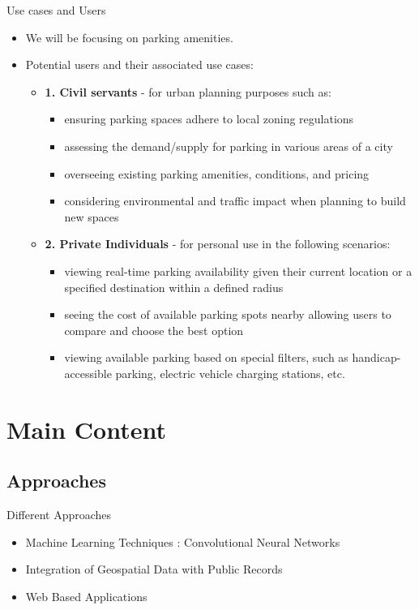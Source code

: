 \documentclass{beamer}
\begin{document}
\begin{frame}{Use cases and Users}
    \begin{itemize}
        \item We will be focusing on parking amenities.
        \item Potential users and their associated use cases:
        \begin{itemize}
            \item \textbf{1. Civil servants} - for urban planning purposes such as:
            \begin{itemize}
                \item ensuring parking spaces adhere to local zoning regulations
                \item assessing the demand/supply for parking in various areas of a city
                \item overseeing existing parking amenities, conditions, and pricing
                \item considering environmental and traffic impact when planning to build new spaces
            \end{itemize}
            \item \textbf{2. Private Individuals} - for personal use in the following scenarios:
            \begin{itemize}
                \item viewing real-time parking availability given their current location or a specified destination within a defined radius
                \item seeing the cost of available parking spots nearby allowing users to compare and choose the best option
                \item viewing available parking based on special filters, such as handicap-accessible parking, electric vehicle charging stations, etc.
            \end{itemize}
        \end{itemize}
    \end{itemize}
\end{frame}


\section{Main Content}
\subsection{Approaches}
\begin{frame}{Different Approaches}
    \begin{itemize}
        \item{Machine Learning Techniques : Convolutional Neural Networks}
        \item{Integration of Geospatial Data with Public Records}
        \item{Web Based Applications}
    \end{itemize}
\end{frame}
\end{document}
